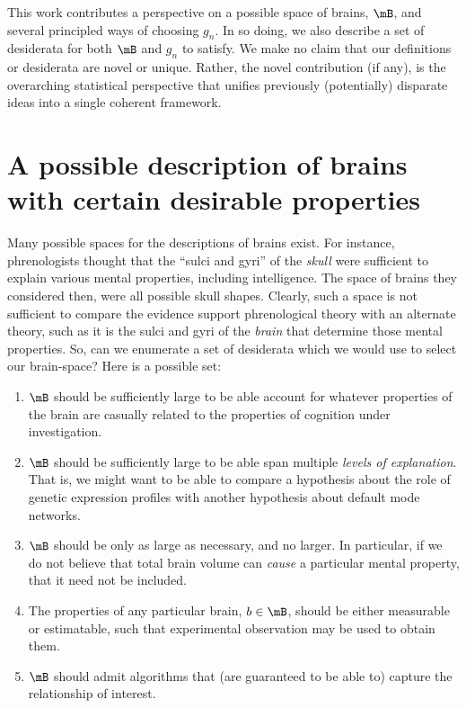 This work contributes a perspective on a possible space of brains, $\mB$, and several principled ways of choosing $g_n$. In so doing, we also describe a set of desiderata for both $\mB$ and $g_n$ to satisfy. We make no claim that our definitions or desiderata are novel or unique. Rather, the novel contribution (if any), is the overarching statistical perspective that unifies previously (potentially) disparate ideas into a single coherent framework.

\section{A possible description of brains with certain desirable properties} 

\label{sec:B}

Many possible spaces for the descriptions of brains exist. For instance, phrenologists thought that the ``sulci and gyri'' of the \emph{skull} were sufficient to explain various mental properties, including intelligence. The space of brains they considered then, were all possible skull shapes. Clearly, such a space is not sufficient to compare the evidence support phrenological theory with an alternate theory, such as it is the sulci and gyri of the \emph{brain} that determine those mental properties. So, can we enumerate a set of desiderata which we would use to select our brain-space? Here is a possible set:
\begin{enumerate}
	\item $\mB$ should be sufficiently large to be able account for whatever properties of the brain are casually related to the properties of cognition under investigation. 
	\item $\mB$ should be sufficiently large to be able span multiple \emph{levels of explanation}. That is, we might want to be able to compare a hypothesis about the role of genetic expression profiles with another hypothesis about default mode networks. 
	\item $\mB$ should be only as large as necessary, and no larger. In particular, if we do not believe that total brain volume can \emph{cause} a particular mental property, that it need not be included. 
	\item The properties of any particular brain, $b\in \mB$, should be either measurable or estimatable, such that experimental observation may be used to obtain them.	%
	\item $\mB$ should admit algorithms that (are guaranteed to be able to) capture the relationship of interest. 
\end{enumerate}

